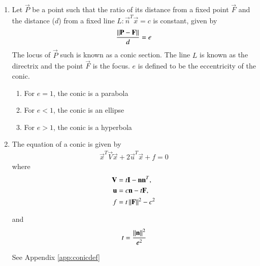 \renewcommand{\theequation}{\theenumi}
\begin{enumerate}[label=\thesubsection.\arabic*.,ref=\thesubsection.\theenumi]
\item Let $\vec{P}$ be a point such that the ratio of its distance from a fixed point $\vec{F}$ and the distance ($d$) from a fixed line 
$L: \vec{n}^T\vec{x}=c$ is constant, given by 
\label{conics/30/def}
\begin{align}
\frac{\left\lVert\mathbf{P}-\mathbf{F}\right\rVert}{d} = e    
\end{align}
The locus of $\vec{P}$ such is known as a conic section. The line $L$ is known as the directrix and the point $\vec{F}$ is the focus. $e$ is defined to be 
the eccentricity of the conic.  
\begin{enumerate}
    \item For $e = 1$, the conic is a parabola
    \item For $e < 1$, the conic is an ellipse
    \item For $e > 1$, the conic is a hyperbola
\end{enumerate}

\item 
The equation of  a conic is given by 
\begin{align}
    \label{eq:conic_quad_form}
    \vec{x}^T\vec{V}\vec{x}+2\vec{u}^T\vec{x}+f=0
    \end{align}
where     
\begin{align}
\mathbf{V} &= t\mathbf{I}-\mathbf{n}\mathbf{n}^T, 
\\
\mathbf{u} &= c\mathbf{n}-t\mathbf{F}, 
\\
f &= t\left\lVert\mathbf{F}\right\rVert^2-c^2
    \end{align}
    
%
and 
\begin{align}
    t=\frac{\left\lVert\mathbf{n}\right\rVert^2}{e^2}
\end{align}

\solution See Appendix \ref{app:conicdef}



\end{enumerate}
